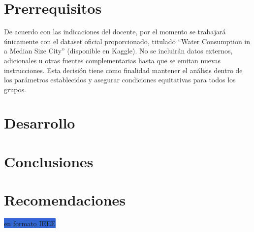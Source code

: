 \documentclass[12pt,a4paper]{report}
\begin{document}
\cite{usechesistema}

\section*{Prerrequisitos}

De acuerdo con las indicaciones del docente, por el momento se trabajará únicamente con el dataset oficial proporcionado, titulado “Water Consumption in a Median Size City” (disponible en Kaggle).
No se incluirán datos externos, adicionales u otras fuentes complementarias hasta que se emitan nuevas instrucciones. Esta decisión tiene como finalidad mantener el análisis dentro de los parámetros establecidos y asegurar condiciones equitativas para todos los grupos.


\section*{Desarrollo}

\section*{Conclusiones} 

\section*{Recomendaciones}


\vspace{0.5cm}

\renewcommand{\bibname}{\MakeUppercase{REFERENCIAS}}


\colorbox{highlight}{en formato IEEE}
\end{document}
